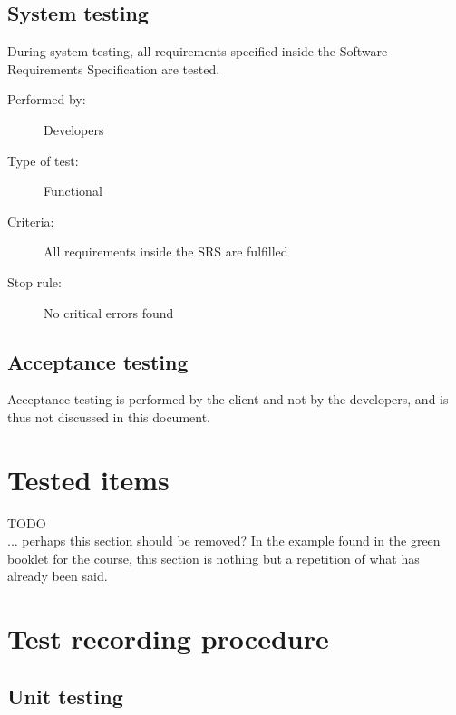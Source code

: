 \documentclass[12pt,titlepage,bibliography=totoc]{article}
\begin{document}
\subsection{System testing}
\label{subsec:test-process-system-testing}

During system testing, all requirements specified inside the Software
Requirements Specification are tested.

\begin{description}
	\item[Performed by:]	Developers
	\item[Type of test:]	Functional
	\item[Criteria:]	All requirements inside the SRS are fulfilled
	\item[Stop rule:]	No critical errors found
\end{description}

\subsection{Acceptance testing}
\label{subsec:test-process-acceptance-testing}

Acceptance testing is performed by the client and not by the developers, and is
thus not discussed in this document.


\section{Tested items}
\label{sec:tested-items}

TODO \\

... perhaps this section should be removed? In the example found in the green
booklet for the course, this section is nothing but a repetition of what has
already been said.



\section{Test recording procedure}
\label{sec:test-recording-procedure}

\subsection{Unit testing}
\label{subsec:test-recording-procedure-unit-testing}
\end{document}
